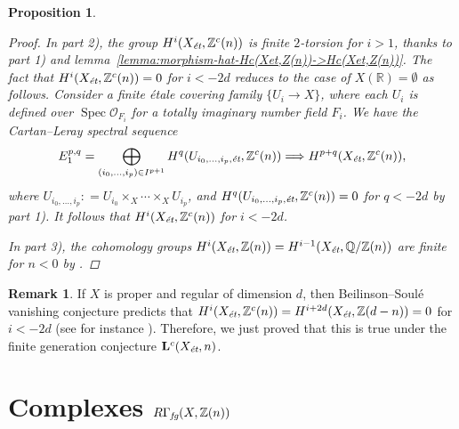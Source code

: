 \documentclass[draft,leqno,12pt]{article}
\theoremstyle{plain}
\newtheorem{proposition}[theorem]{\indent\sc Proposition}
\theoremstyle{definition}
\newtheorem{remark}[theorem]{\indent\sc Remark}
\DeclareMathOperator{\Spec}{Spec}
\newcommand{\ZZ}{\mathbb{Z}}
\newcommand{\QQ}{\mathbb{Q}}
\newcommand{\RR}{\mathbb{R}}
\newcommand{\dfn}{\mathrel{\mathop:}=}
\newcommand{\et}{\text{\it \'{e}t}}
\newcommand{\fg}{\text{\it fg}}
\begin{document}
\begin{proposition}
\begin{proof}
    In part 2), the group $H^i (X_\et, \ZZ^c (n))$ is finite $2$-torsion for
    $i > 1$, thanks to part 1) and
    lemma~\ref{lemma:morphism-hat-Hc(Xet,Z(n))->Hc(Xet,Z(n))}. The fact that
    $H^i (X_\et, \ZZ^c (n)) = 0$ for $i < -2d$ reduces to the case of
    $X (\RR) = \emptyset$ as follows. Consider a finite \'{e}tale covering family
    $\{ U_i \to X \}$, where each $U_i$ is defined over
    $\Spec \mathcal{O}_{F_i}$ for a totally imaginary number field $F_i$.
    We have the Cartan--Leray spectral sequence
    \[ E_1^{p,q} = \bigoplus_{(i_0,\ldots,i_p) \in I^{p+1}} H^q (U_{i_0,\ldots,i_p, \et}, \ZZ^c (n))
      \Longrightarrow H^{p+q} (X_\et, \ZZ^c (n)), \]
    where $U_{i_0,\ldots,i_p} \dfn U_{i_0} \times_X \cdots \times_X U_{i_p}$, and
    $H^q (U_{i_0,\ldots,i_p, \et}, \ZZ^c (n)) = 0$ for $q < -2d$ by part 1).
    It follows that $H^i (X_\et, \ZZ^c (n))$ for $i < -2d$.

    In part 3), the cohomology groups
    $H^i (X_\et, \ZZ (n)) = H^{i-1} (X_\et, \QQ/\ZZ (n))$ are finite for $n < 0$
    by \cite[Theorem~3]{Kahn-2003}.
  \end{proof}
\end{proposition}

\begin{remark}
  If $X$ is proper and regular of dimension $d$, then Beilinson--Soul\'{e}
  vanishing conjecture predicts that
  $H^i (X_\et, \ZZ^c (n)) = H^{i+2d} (X_\et, \ZZ (d-n)) = 0$ for $i < -2d$
  (see for instance \cite[\S 4.3.4]{Kahn-2005}). Therefore, we just proved that
  this is true under the finite generation conjecture $\mathbf{L}^c (X_\et, n)$.
\end{remark}


\section{Complexes $R\Gamma_\fg (X, \ZZ(n))$}
\label{sec:RGamma-fg}
\end{document}
